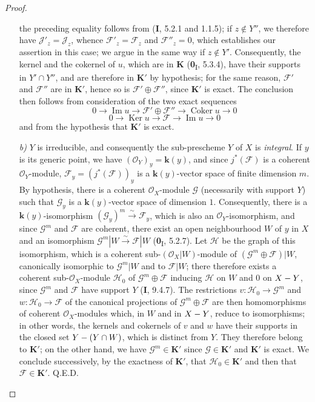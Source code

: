 \begin{proof}
\begin{enumerate}
the preceding equality follows from (\textbf{I}, 5.2.1 and 1.1.5); if $z\notin Y''$, we
therefore have $\mathcal J'_z=\mathcal J_z$, whence $\mathcal F'_z=\mathcal F_z$ and
$\mathcal F''_z=0$, which establishes our assertion in this case; we argue
in the same way if $z\notin Y'$. Consequently, the kernel and the cokernel of $u$,
which are in $\boldsymbol{K}$ (\textbf{0}\textsubscript{I}, 5.3.4), have their supports in $Y'\cap Y''$,
and are therefore in $\boldsymbol{K}'$ by hypothesis; for the same reason, $\mathcal F'$ and
$\mathcal F''$ are in $\boldsymbol{K}'$, hence so is $\mathcal F'\oplus\mathcal F''$,
since $\boldsymbol{K}'$ is exact. The conclusion then follows from consideration of the
two exact sequences
\[
0\longrightarrow\operatorname{Im}u\longrightarrow
\mathcal F'\oplus\mathcal F''\longrightarrow
\operatorname{Coker}u\longrightarrow0
\]
\[
0\longrightarrow\operatorname{Ker}u\longrightarrow\mathcal F
\longrightarrow\operatorname{Im}u\longrightarrow0
\]
and from the hypothesis that $\boldsymbol{K}'$ is exact.

\item[\textit{b)}] $Y$ is irreducible, and consequently the sub-prescheme $Y$ of $X$ is
\emph{integral}. If $y$ is its generic point, we have
$(\mathcal O_Y)_y=\boldsymbol{k}(y)$, and since $j^*(\mathcal F)$ is a coherent
$\mathcal O_Y$-module, $\mathcal F_y=(j^*(\mathcal F))_y$ is a
$\boldsymbol{k}(y)$-vector space of finite dimension $m$. By hypothesis, there is a
coherent $\mathcal O_X$-module $\mathcal G$ (necessarily with support $Y$)
such that $\mathcal G_y$ is a $\boldsymbol{k}(y)$-vector space of dimension $1$.
Consequently, there is a $\boldsymbol{k}(y)$-isomorphism
$(\mathcal G_y)^m\xrightarrow{\sim}\mathcal F_y$, which is also an
$\mathcal O_Y$-isomorphism, and since $\mathcal G^m$ and $\mathcal F$ are
coherent, there exist an open neighbourhood $W$ of $y$ in $X$ and an
isomorphism $\mathcal G^m|W\xrightarrow{\sim}\mathcal F|W$
(\textbf{0}\textsubscript{I}, 5.2.7). Let $\mathcal H$ be the graph of this isomorphism,
which is a coherent sub-$(\mathcal O_X|W)$-module of
$(\mathcal G^m\oplus\mathcal F)|W$, canonically isomorphic to
$\mathcal G^m|W$ and to $\mathcal F|W$; there therefore exists a coherent
sub-$\mathcal O_X$-module $\mathcal H_0$ of $\mathcal G^m\oplus\mathcal F$
inducing $\mathcal H$ on $W$ and $0$ on $X- Y$, since $\mathcal G^m$ and
$\mathcal F$ have support $Y$ (\textbf{I}, 9.4.7). The restrictions
$v:\mathcal H_0\to\mathcal G^m$ and $w:\mathcal H_0\to\mathcal F$ of the
canonical projections of $\mathcal G^m\oplus\mathcal F$ are then
homomorphisms of coherent $\mathcal O_X$-modules which, in $W$ and in
$X- Y$, reduce to isomorphisms; in other words, the kernels and
cokernels of $v$ and $w$ have their supports in the closed set
$Y-(Y\cap W)$, which is distinct from $Y$. They therefore belong to $\boldsymbol{K}'$; on the
other hand, we have $\mathcal G^m\in\boldsymbol{K}'$ since $\mathcal G\in\boldsymbol{K}'$ and
$\boldsymbol{K}'$ is exact. We conclude successively, by the exactness of $\boldsymbol{K}'$, that
$\mathcal H_0\in\boldsymbol{K}'$ and then that $\mathcal F\in\boldsymbol{K}'$. Q.E.D.
\end{enumerate}
\end{proof}

